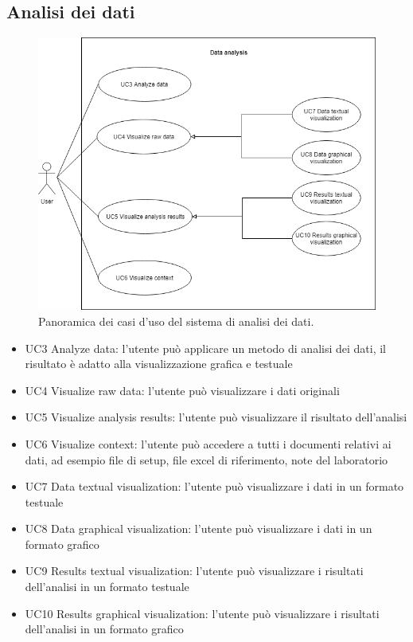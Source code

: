\subsection{Analisi dei dati}


\begin{figure} [H]
	\includegraphics[width=\textwidth]{figures/UCDataAnalysis}
	\caption[Panoramica casi d'uso analisi dei dati]{
		Panoramica dei casi d'uso del sistema di analisi dei dati.
		\label{fig:UCDataAnalysis}}
\end{figure}

\begin{itemize}
	\item UC3 Analyze data: l'utente può applicare un metodo di analisi dei dati, il risultato è adatto alla visualizzazione grafica e testuale
	\item UC4 Visualize raw data: l'utente può visualizzare i dati originali
	\item UC5 Visualize analysis results: l'utente può visualizzare il risultato dell'analisi
	\item UC6 Visualize context: l'utente può accedere a tutti i documenti relativi ai dati, ad esempio file di setup, file excel di riferimento, note del laboratorio
	\item UC7 Data textual visualization: l'utente può visualizzare i dati in un formato testuale
	\item UC8 Data graphical visualization: l'utente può visualizzare i dati in un formato grafico
	\item UC9 Results textual visualization: l'utente può visualizzare i risultati dell'analisi in un formato testuale
	\item UC10 Results graphical visualization: l'utente può visualizzare i risultati dell'analisi in un formato grafico
\end{itemize}

